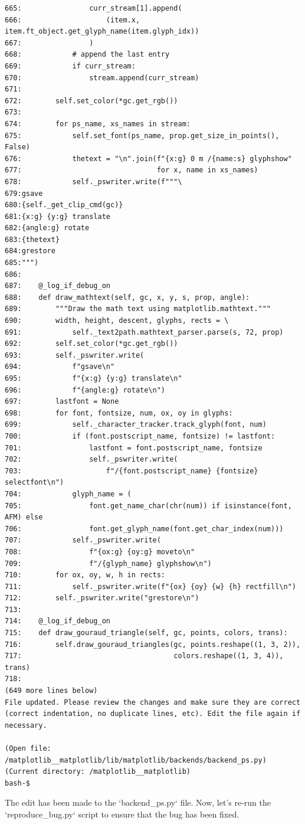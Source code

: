 {\begin{observationbox}
\begin{Verbatim}[breaklines=true, breakanywhere=true]
665:                curr_stream[1].append(
666:                    (item.x, item.ft_object.get_glyph_name(item.glyph_idx))
667:                )
668:            # append the last entry
669:            if curr_stream:
670:                stream.append(curr_stream)
671:
672:        self.set_color(*gc.get_rgb())
673:
674:        for ps_name, xs_names in stream:
675:            self.set_font(ps_name, prop.get_size_in_points(), False)
676:            thetext = "\n".join(f"{x:g} 0 m /{name:s} glyphshow"
677:                                for x, name in xs_names)
678:            self._pswriter.write(f"""\
679:gsave
680:{self._get_clip_cmd(gc)}
681:{x:g} {y:g} translate
682:{angle:g} rotate
683:{thetext}
684:grestore
685:""")
686:
687:    @_log_if_debug_on
688:    def draw_mathtext(self, gc, x, y, s, prop, angle):
689:        """Draw the math text using matplotlib.mathtext."""
690:        width, height, descent, glyphs, rects = \
691:            self._text2path.mathtext_parser.parse(s, 72, prop)
692:        self.set_color(*gc.get_rgb())
693:        self._pswriter.write(
694:            f"gsave\n"
695:            f"{x:g} {y:g} translate\n"
696:            f"{angle:g} rotate\n")
697:        lastfont = None
698:        for font, fontsize, num, ox, oy in glyphs:
699:            self._character_tracker.track_glyph(font, num)
700:            if (font.postscript_name, fontsize) != lastfont:
701:                lastfont = font.postscript_name, fontsize
702:                self._pswriter.write(
703:                    f"/{font.postscript_name} {fontsize} selectfont\n")
704:            glyph_name = (
705:                font.get_name_char(chr(num)) if isinstance(font, AFM) else
706:                font.get_glyph_name(font.get_char_index(num)))
707:            self._pswriter.write(
708:                f"{ox:g} {oy:g} moveto\n"
709:                f"/{glyph_name} glyphshow\n")
710:        for ox, oy, w, h in rects:
711:            self._pswriter.write(f"{ox} {oy} {w} {h} rectfill\n")
712:        self._pswriter.write("grestore\n")
713:
714:    @_log_if_debug_on
715:    def draw_gouraud_triangle(self, gc, points, colors, trans):
716:        self.draw_gouraud_triangles(gc, points.reshape((1, 3, 2)),
717:                                    colors.reshape((1, 3, 4)), trans)
718:
(649 more lines below)
File updated. Please review the changes and make sure they are correct (correct indentation, no duplicate lines, etc). Edit the file again if necessary.

(Open file: /matplotlib__matplotlib/lib/matplotlib/backends/backend_ps.py)
(Current directory: /matplotlib__matplotlib)
bash-$
\end{Verbatim}
\end{observationbox}
\begin{agentbox}[matplotlib\_\_matplotlib-23964]
The edit has been made to the `backend\_ps.py` file. Now, let's re-run the `reproduce\_bug.py` script to ensure that the bug has been fixed.


\end{agentbox}}

